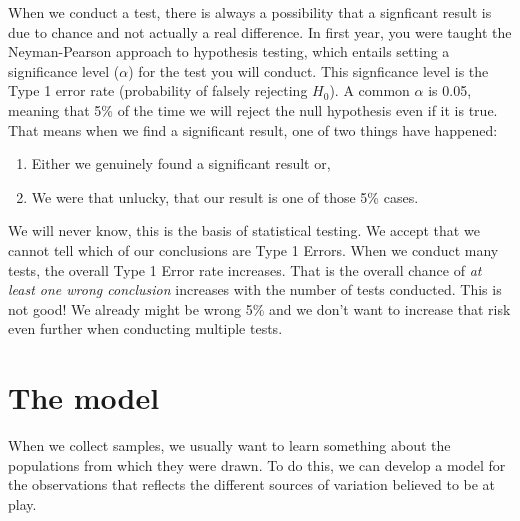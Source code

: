 \documentclass[
  letterpaper,
  DIV=11,
  numbers=noendperiod,
  oneside]{scrreprt}
\providecommand{\tightlist}{%
  \setlength{\itemsep}{0pt}\setlength{\parskip}{0pt}}\usepackage{longtable,booktabs,array}
\begin{document}
\begin{tcolorbox}[enhanced jigsaw, colframe=quarto-callout-caution-color-frame, breakable, arc=.35mm, toptitle=1mm, colback=white, title={Multiple Testing / Comparisons}, opacityback=0, bottomrule=.15mm, opacitybacktitle=0.6, colbacktitle=quarto-callout-caution-color!10!white, toprule=.15mm, rightrule=.15mm, bottomtitle=1mm, leftrule=.75mm, titlerule=0mm, coltitle=black, left=2mm]

When we conduct a test, there is always a possibility that a signficant
result is due to chance and not actually a real difference. In first
year, you were taught the Neyman-Pearson approach to hypothesis testing,
which entails setting a significance level (\(\alpha\)) for the test you
will conduct. This signficance level is the Type 1 error rate
(probability of falsely rejecting \(H_0\)). A common \(\alpha\) is 0.05,
meaning that 5\% of the time we will reject the null hypothesis even if
it is true. That means when we find a significant result, one of two
things have happened:

\begin{enumerate}
\def\labelenumi{\arabic{enumi}.}
\tightlist
\item
  Either we genuinely found a significant result or,
\item
  We were that unlucky, that our result is one of those 5\% cases.
\end{enumerate}

We will never know, this is the basis of statistical testing. We accept
that we cannot tell which of our conclusions are Type 1 Errors. When we
conduct many tests, the overall Type 1 Error rate increases. That is the
overall chance of \emph{at least one wrong conclusion} increases with
the number of tests conducted. This is not good! We already might be
wrong 5\% and we don't want to increase that risk even further when
conducting multiple tests.

\end{tcolorbox}

\section{The model}\label{the-model}

When we collect samples, we usually want to learn something about the
populations from which they were drawn. To do this, we can develop a
model for the observations that reflects the different sources of
variation believed to be at play.
\end{document}
